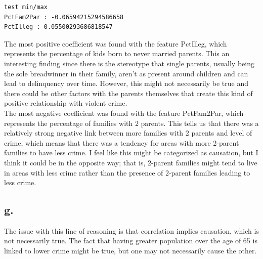 \documentclass{article}
\newcommand{\1}{\mathbf{1}}
\begin{document}
{\begin{verbatim}
test min/max
PctFam2Par : -0.06594215294586658
PctIlleg : 0.05500293686818547

\end{verbatim}

The most positive coefficient was found with the feature PctIlleg, which represents the percentage of kids born to never married parents. This an interesting finding since there is the stereotype that single parents, usually being the sole breadwinner in their family, aren't as present around children and can lead to delinquency over time. However, this might not necessarily be true and there could be other factors with the parents themselves that create this kind of positive relationship with violent crime. \\
The most negative coefficient was found with the feature PctFam2Par, which represents the percentage of families with 2 parents. This tells us that there was a relatively strong negative link between more families with 2 parents and level of crime, which means that there was a tendency for areas with more 2-parent families to have less crime. I feel like this might be categorized as causation, but I think it could be in the opposite way; that is, 2-parent families might tend to live in areas with less crime rather than the presence of 2-parent families leading to less crime. 

\subsection*{g.}

The issue with this line of reasoning is that correlation implies causation, which is not necessarily true. The fact that having greater population over the age of 65 is linked to lower crime might be true, but one may not necessarily cause the other. 

\newpage

}
\end{document}
